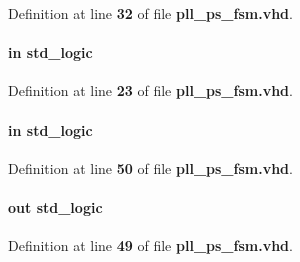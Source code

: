 Definition at line {\bf 32} of file {\bf pll\+\_\+ps\+\_\+fsm.\+vhd}.

\paragraph[{reset\+\_\+n}]{ {\bfseries \textcolor{keywordflow}{in}\textcolor{vhdlchar}{ }} {\bfseries \textcolor{comment}{std\+\_\+logic}\textcolor{vhdlchar}{ }} \hspace{0.3cm}{\ttfamily [Port]}}\label{classpll__ps__fsm_a446ea52ed8c4a84181a47d9165ce41a5}


Definition at line {\bf 23} of file {\bf pll\+\_\+ps\+\_\+fsm.\+vhd}.

\paragraph[{smpl\+\_\+cmp\+\_\+done}]{ {\bfseries \textcolor{keywordflow}{in}\textcolor{vhdlchar}{ }} {\bfseries \textcolor{comment}{std\+\_\+logic}\textcolor{vhdlchar}{ }} \hspace{0.3cm}{\ttfamily [Port]}}\label{classpll__ps__fsm_a7cefce4dde1ccb9ca521e02c5f2f9044}


Definition at line {\bf 50} of file {\bf pll\+\_\+ps\+\_\+fsm.\+vhd}.

\paragraph[{smpl\+\_\+cmp\+\_\+en}]{ {\bfseries \textcolor{keywordflow}{out}\textcolor{vhdlchar}{ }} {\bfseries \textcolor{comment}{std\+\_\+logic}\textcolor{vhdlchar}{ }} \hspace{0.3cm}{\ttfamily [Port]}}\label{classpll__ps__fsm_abde511db8e14b8bf12a4d291e0991cb1}


Definition at line {\bf 49} of file {\bf pll\+\_\+ps\+\_\+fsm.\+vhd}.

